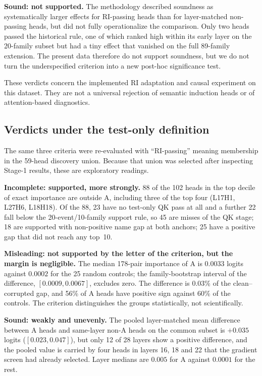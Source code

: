\documentclass[11pt,a4paper]{article}
\begin{document}
\textbf{Sound: not supported.} The methodology described soundness as
systematically larger effects for RI-passing heads than for layer-matched
non-passing heads, but did not fully operationalize the comparison. Only two
heads passed the historical rule, one of which ranked high within its early
layer on the 20-family subset but had a tiny effect that vanished on the full
89-family extension. The present data therefore do not support soundness, but
we do not turn the underspecified criterion into a new post-hoc significance
test.

These verdicts concern the implemented RI adaptation and causal experiment on
this dataset. They are not a universal rejection of semantic induction heads or
of attention-based diagnostics.

\subsection*{Verdicts under the test-only definition}
The same three criteria were re-evaluated with ``RI-passing'' meaning membership
in the 59-head discovery union. Because that union was selected after inspecting
Stage-1 results, these are exploratory readings.

\textbf{Incomplete: supported, more strongly.} 88 of the 102 heads in the top
decile of exact importance are outside A, including three of the top four
(L17H1, L27H6, L18H18). Of the 88, 23 have no test-only QK pass at all and a
further 22 fall below the 20-event/10-family support rule, so 45 are misses of
the QK stage; 18 are supported with non-positive name gap at both anchors; 25
have a positive gap that did not reach any top~10.

\textbf{Misleading: not supported by the letter of the criterion, but the
margin is negligible.} The median 178-pair importance of A is $0.0033$ logits
against $0.0002$ for the 25 random controls; the family-bootstrap interval of the
difference, $[0.0009,0.0067]$, excludes zero. The difference is 0.03\% of the
clean--corrupted gap, and 56\% of A heads have positive sign against 60\% of
the controls. The criterion distinguishes the groups statistically, not
scientifically.

\textbf{Sound: weakly and unevenly.} The pooled layer-matched mean difference
between A heads and same-layer non-A heads on the common subset is $+0.035$
logits ($[0.023,0.047]$), but only 12 of 28 layers show a positive difference,
and the pooled value is carried by four heads in layers 16, 18 and 22 that the
gradient screen had already selected. Layer medians are $0.005$ for A against
$0.0001$ for the rest.
\end{document}
